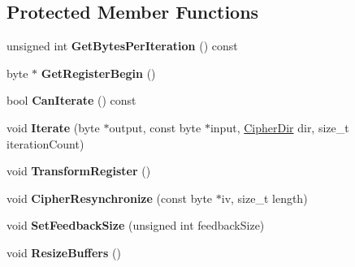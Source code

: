 \subsection*{Protected Member Functions}
\begin{DoxyCompactItemize}
\item 
\hypertarget{class_c_f_b___mode_policy_a72453b9cc2666b3fede9b20dd2c63d47}{
unsigned int {\bfseries GetBytesPerIteration} () const }
\label{class_c_f_b___mode_policy_a72453b9cc2666b3fede9b20dd2c63d47}

\item 
\hypertarget{class_c_f_b___mode_policy_ad33d9b4fab007750dac748a0d25cb49f}{
byte $\ast$ {\bfseries GetRegisterBegin} ()}
\label{class_c_f_b___mode_policy_ad33d9b4fab007750dac748a0d25cb49f}

\item 
\hypertarget{class_c_f_b___mode_policy_abec98a28936c204ec48426f73c40b0bb}{
bool {\bfseries CanIterate} () const }
\label{class_c_f_b___mode_policy_abec98a28936c204ec48426f73c40b0bb}

\item 
\hypertarget{class_c_f_b___mode_policy_aa67057e782fcf24bd0e259f8228ab70d}{
void {\bfseries Iterate} (byte $\ast$output, const byte $\ast$input, \hyperlink{cryptlib_8h_a353ccabf5ddc119a6a33e92f7b9961c7}{CipherDir} dir, size\_\-t iterationCount)}
\label{class_c_f_b___mode_policy_aa67057e782fcf24bd0e259f8228ab70d}

\item 
\hypertarget{class_c_f_b___mode_policy_adbefecab5cb048bfce9cdea106ef3ac0}{
void {\bfseries TransformRegister} ()}
\label{class_c_f_b___mode_policy_adbefecab5cb048bfce9cdea106ef3ac0}

\item 
\hypertarget{class_c_f_b___mode_policy_a04f573ff24b1335e400f9c64aeeb27f5}{
void {\bfseries CipherResynchronize} (const byte $\ast$iv, size\_\-t length)}
\label{class_c_f_b___mode_policy_a04f573ff24b1335e400f9c64aeeb27f5}

\item 
\hypertarget{class_c_f_b___mode_policy_a94b4e3f06db50fd888ec24026323646d}{
void {\bfseries SetFeedbackSize} (unsigned int feedbackSize)}
\label{class_c_f_b___mode_policy_a94b4e3f06db50fd888ec24026323646d}

\item 
\hypertarget{class_c_f_b___mode_policy_a17ae07ee0ef40f778bd94a52202ed2be}{
void {\bfseries ResizeBuffers} ()}
\label{class_c_f_b___mode_policy_a17ae07ee0ef40f778bd94a52202ed2be}

\end{DoxyCompactItemize}
